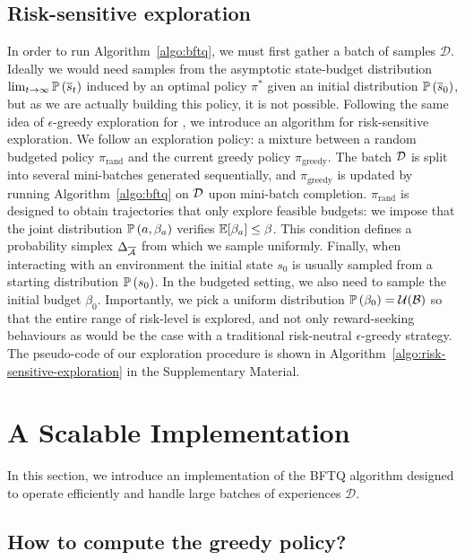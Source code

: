 \documentclass{article}
\begin{document}
\subsection{Risk-sensitive exploration}

\label{sec:exploration}

In order to run Algorithm~\ref{algo:bftq}, we must first gather a batch of samples $\mathcal{D}$. Ideally we would need samples from the asymptotic state-budget distribution $\lim_{t\rightarrow\infty}\mathbb{P}\left(\overline{s}_t\right)$ induced by an optimal policy $\pi^*$ given an initial distribution $\mathbb{P}\left(\overline{s}_0\right)$, but as we are actually building this policy, it is not possible. Following the same idea of $\epsilon$-greedy exploration for \FTQ \citep{Ernst2005,Riedmiller2005}, we introduce an algorithm for risk-sensitive exploration. We follow an exploration policy: a mixture between a random budgeted policy $\pi_\text{rand}$ and the current greedy policy $\pi_\text{greedy}$. The batch $\mathcal{D}$ is split into several mini-batches generated sequentially, and $\pi_\text{greedy}$ is updated by running Algorithm~\ref{algo:bftq} on $\mathcal{D}$ upon mini-batch completion. $\pi_\text{rand}$ is designed to obtain trajectories that only explore feasible budgets: we impose that the joint distribution $\mathbb{P}\left(a, \beta_a\right)$ verifies $\operatorname*{\mathbb{E}}[\beta_a]\leq\beta$. This condition defines a probability simplex $\Delta_{\overline{\mathcal{A}}}$ from which we sample uniformly. Finally, when interacting with an environment the initial state $s_0$ is usually sampled from a starting distribution $\mathbb{P}\left(s_0\right)$. In the budgeted setting, we also need to sample the initial budget $\beta_0$. Importantly, we pick a uniform distribution $\mathbb{P}\left(\beta_0\right) = \mathcal{U}(\mathcal{B})$ so that the entire range of risk-level is explored, and not only reward-seeking behaviours as would be the case with a traditional risk-neutral $\epsilon$-greedy strategy. The pseudo-code of our exploration procedure is shown in Algorithm~\ref{algo:risk-sensitive-exploration} in the Supplementary Material.

\section{A Scalable Implementation}

\label{sec:scalable-bftq}
In this section, we introduce an implementation of the BFTQ algorithm designed to operate efficiently and handle large batches of experiences $\mathcal{D}$.

\subsection{How to compute the greedy policy?}
\end{document}
